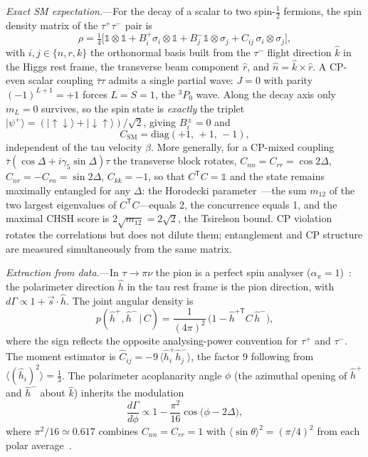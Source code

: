 \documentclass[prl,twocolumn,superscriptaddress,floatfix]{revtex4-2}
\newcommand{\tautau}{\tau^+\tau^-}
\newcommand{\mtwo}{m_{12}}
\newcommand{\hhat}{\hat{h}}
\begin{document}
\textit{Exact SM expectation.}---For the decay of a scalar to two
spin-$\tfrac12$ fermions, the spin density matrix of the $\tautau$
pair is
\begin{equation}
  \rho = \tfrac{1}{4}\bigl[\mathbb{1}\otimes\mathbb{1}
    + B_i^+ \sigma_i\otimes\mathbb{1}
    + B_j^- \mathbb{1}\otimes\sigma_j
    + C_{ij}\,\sigma_i\otimes\sigma_j \bigr],
  \label{eq:rho}
\end{equation}
with $i,j\in\{n,r,k\}$ the orthonormal basis built from the $\tau^-$
flight direction $\hat{k}$ in the Higgs rest frame, the transverse
beam component $\hat{r}$, and $\hat{n}=\hat{k}\times\hat{r}$.
A CP-even scalar coupling $\bar\tau\tau$ admits a single partial
wave: $J=0$ with parity $(-1)^{L+1}=+1$ forces $L=S=1$, the
${}^3\!P_0$ wave.  Along the decay axis only $m_L=0$ survives, so
the spin state is \emph{exactly} the triplet
$|\psi^+\rangle=(|{\uparrow\downarrow}\rangle
+|{\downarrow\uparrow}\rangle)/\sqrt{2}$, giving $B_i^\pm=0$ and
\begin{equation}
  C_{\mathrm{SM}} = \mathrm{diag}(+1,\,+1,\,-1),
  \label{eq:Cij_SM}
\end{equation}
independent of the tau velocity $\beta$.  More generally, for a
CP-mixed coupling $\bar\tau(\cos\Delta+i\gamma_5\sin\Delta)\tau$ the
transverse block rotates,
$C_{nn}=C_{rr}=\cos2\Delta$, $C_{nr}=-C_{rn}=\sin2\Delta$,
$C_{kk}=-1$,
so that $C^{\mathsf{T}}C=\mathbb{1}$ and the state remains maximally
entangled for any $\Delta$: the Horodecki
parameter~\cite{Horodecki1995}---the sum $\mtwo$ of the two largest
eigenvalues of $C^{\mathsf{T}}C$---equals 2, the concurrence
equals 1, and the maximal CHSH score is
$2\sqrt{\mtwo}=2\sqrt{2}$, the Tsirelson bound.  CP violation rotates
the correlations but does not dilute them; entanglement and CP
structure are measured simultaneously from the same matrix.

\textit{Extraction from data.}---In $\tau\to\pi\nu$ the pion is a
perfect spin analyser ($\alpha_\pi=1$)~\cite{Tsai1971}: the
polarimeter direction $\hhat$ in the tau rest frame is the pion
direction, with $d\Gamma\propto 1+\vec{s}\cdot\hhat$.  The
joint angular density is
\begin{equation}
  p(\hhat^+,\hhat^-\,|\,C) =
  \frac{1}{(4\pi)^2}\,
  \bigl(1 - \hhat^{+\mathsf{T}} C\, \hhat^-\bigr),
  \label{eq:density}
\end{equation}
where the sign reflects the opposite analysing-power convention for
$\tau^+$ and $\tau^-$.  The moment estimator is
$\hat C_{ij}=-9\,\langle \hhat^+_i \hhat^-_j\rangle$,
the factor 9 following from $\langle (\hhat_i)^2\rangle=\tfrac13$.
The polarimeter acoplanarity angle $\phi$ (the azimuthal opening of
$\hhat^+$ and $\hhat^-$ about $\hat k$) inherits the modulation
\begin{equation}
  \frac{d\Gamma}{d\phi} \propto
  1 - \frac{\pi^2}{16}\cos\bigl(\phi - 2\Delta\bigr),
  \label{eq:acopl}
\end{equation}
where $\pi^2/16\simeq0.617$ combines $C_{nn}=C_{rr}=1$ with
$\langle\sin\theta\rangle^2=(\pi/4)^2$ from each polar
average~\cite{Harnik2013,Desch2004}.
\end{document}
